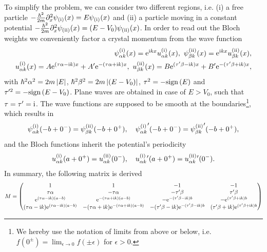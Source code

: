 To simplify the problem, we can consider two different regions, i.e. (i) a free particle $-\frac{\hbar^2}{2m}\partial_x^2\psi_{\rm (i)}(x) = E\psi_{\rm (i)}(x)$ and (ii) a particle moving in a constant potential $-\frac{\hbar^2}{2m}\partial_x^2\psi_{\rm (ii)}(x) = (E-V_0)\psi_{\rm (ii)}(x)$.
In order to read out the Bloch weights we conveniently factor a crystal momentum from the wave function
\begin{align}
    \psi_{\alpha k}^{\rm (i)}(x) = \mathrm e^{\mathrm i kx}u_{\alpha k}^{\rm (i)}(x),
    \
    \psi_{\beta k}^{\rm (ii)}(x) = \mathrm e^{\mathrm i kx}u_{\beta k}^{\rm (ii)}(x),
    \\
    u_{\alpha k}^{\rm (i)}(x) = A\mathrm e^{(\tau\alpha-\mathrm i k) x} + A'\mathrm e^{-(\tau\alpha+\mathrm i k) x},
    \
    u_{\beta k}^{\rm (ii)}(x) = B\mathrm e^{(\tau'\beta-\mathrm i k) x} + B'\mathrm e^{-(\tau'\beta+\mathrm i k) x},
\end{align}
with $\hbar^2\alpha^2 = 2m\left| E \right|$, $\hbar^2\beta^2 = 2m\left| (E-V_0) \right|$, $\tau^2=-\text{sign}\left( E \right)$ and $\tau'^2=-\text{sign}\left( E-V_0 \right)$.
Plane waves are obtained in case of $E>V_0$, such that $\tau=\tau'=\mathrm i$.
The wave functions are supposed to be smooth at the boundaries\footnote{We hereby use the notation of limits from above or below, i.e. $f(0^\pm)=\lim_{\epsilon\rightarrow0}f(\pm\epsilon)$ for $\epsilon>0$.}, which results in
\begin{align}
    \psi_{\alpha k}^{\rm (i)}(-b+0^-)=\psi_{\beta k}^{\rm (ii)}(-b+0^+),
    \quad
    {\psi_{\alpha k}^{\rm (i)}}'(-b+0^-)={\psi_{\beta k}^{\rm (ii)}}'(-b+0^+),
\end{align}
and the Bloch functions inherit the potential's periodicity
\begin{align}
    u_{\alpha k}^{\rm (i)}(a+0^+) = u_{\alpha k}^{\rm (ii)}(0^-),
    \quad
    u_{\alpha k}^{\rm (i)}{}'(a+0^+) = u_{\alpha k}^{\rm (ii)}{}'(0^-).
\end{align}
In summary, the following matrix is derived
{\footnotesize
\begin{align}
    M =
    \begin{pmatrix}
        1 & 1 & -1 & -1\\
        \tau\alpha & -\tau\alpha & -\tau'\beta & \tau'\beta\\
        \mathrm e^{(\tau \alpha-\mathrm i k)(a-b)}  & \mathrm e^{-(\tau \alpha+\mathrm i k) (a-b)} &
        -\mathrm e^{-(\tau'\beta -\mathrm i k)b}     & -\mathrm e^{ (\tau'\beta+\mathrm i k)b} \\
        (\tau \alpha-\mathrm i k)\mathrm e^{(\tau \alpha-\mathrm i k)(a-b)}  & -(\tau \alpha+\mathrm i k)\mathrm e^{-(\tau \alpha+\mathrm i k) (a-b)} &
        -(\tau'\beta -\mathrm i k)\mathrm e^{-(\tau'\beta -\mathrm i k)b}     & (\tau'\beta+\mathrm i k)\mathrm e^{ (\tau'\beta+\mathrm i k)b} \nonumber\\
    \end{pmatrix}
\end{align}
}%
